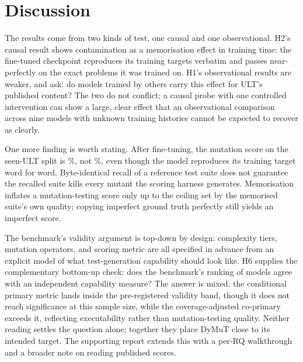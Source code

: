 \section{Discussion}
\label{sec:discussion}

The results come from two kinds of test, one causal and one observational. H2's causal result shows contamination as a memorisation effect in training time: the fine-tuned checkpoint reproduces its training targets verbatim and passes near-perfectly on the exact problems it was trained on. H1's observational results are weaker, and ask: do models trained by others carry this effect for ULT's published content? The two do not conflict; a causal probe with one controlled intervention can show a large, clear effect that an observational comparison across nine models with unknown training histories cannot be expected to recover as clearly.

One more finding is worth stating. After fine-tuning, the mutation score on the seen-ULT split is \HTwoPostMutk{}\%, not \MutkCeiling{}\%, even though the model reproduces its training target word for word. Byte-identical recall of a reference test suite does not guarantee the recalled suite kills every mutant the scoring harness generates. Memorisation inflates a mutation-testing score only up to the ceiling set by the memorised suite's own quality; copying imperfect ground truth perfectly still yields an imperfect score.

The benchmark's validity argument is top-down by design: complexity tiers, mutation operators, and scoring metric are all specified in advance from an explicit model of what test-generation capability should look like. H6 supplies the complementary bottom-up check: does the benchmark's ranking of models agree with an independent capability measure? The answer is mixed: the conditional primary metric lands inside the pre-registered validity band, though it does not reach significance at this sample size, while the coverage-adjusted co-primary exceeds it, reflecting executability rather than mutation-testing quality. Neither reading settles the question alone; together they place DyMuT close to its intended target. The supporting report extends this with a per-RQ walkthrough and a broader note on reading published scores.

